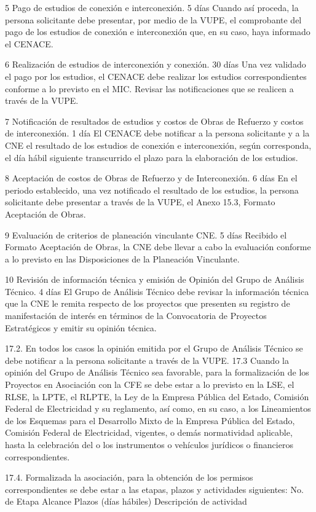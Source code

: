  5
 Pago de estudios de conexión e interconexión. 
 5 días
 Cuando así proceda, la persona solicitante debe presentar, por medio de la VUPE, el comprobante del pago de los estudios de conexión e interconexión que, en su caso, haya informado el CENACE.
 
 6
 Realización de estudios de interconexión y conexión.
 30 días
 Una vez validado el pago por los estudios, el CENACE debe realizar los estudios correspondientes conforme a lo previsto en el MIC. Revisar las notificaciones que se realicen a través de la VUPE.
 
 7
 Notificación de resultados de estudios y costos de Obras de Refuerzo y costos de interconexión.
 1 día
 El CENACE debe notificar a la persona solicitante y a la CNE el resultado de los estudios de conexión e interconexión, según corresponda, el día hábil siguiente transcurrido el plazo para la elaboración de los estudios. 
 
 8
 Aceptación de costos de Obras de Refuerzo y de Interconexión.
 6 días
 En el periodo establecido, una vez notificado el resultado de los estudios, la persona solicitante debe presentar a través de la VUPE, el Anexo 15.3, Formato Aceptación de Obras.
 
 9
 Evaluación de criterios de planeación vinculante CNE.
 5 días
 Recibido el Formato Aceptación de Obras, la CNE debe llevar a cabo la evaluación conforme a lo previsto en las Disposiciones de la Planeación Vinculante.
 
 10
 Revisión de información técnica y emisión de Opinión del Grupo de Análisis Técnico.
 4 días
 El Grupo de Análisis Técnico debe revisar la información técnica que la CNE le remita respecto de los proyectos que presenten su registro de manifestación de interés en términos de la Convocatoria de Proyectos Estratégicos y emitir su opinión técnica. 
 
 
17.2. En todos los casos la opinión emitida por el Grupo de Análisis Técnico se debe notificar a la persona solicitante a través de la VUPE.
17.3 Cuando la opinión del Grupo de Análisis Técnico sea favorable, para la formalización de los Proyectos en Asociación con la CFE se debe estar a lo previsto en la LSE, el RLSE, la LPTE, el RLPTE, la Ley de la Empresa Pública del Estado, Comisión Federal de Electricidad y su reglamento, así como, en su caso, a los Lineamientos de los Esquemas para el Desarrollo Mixto de la Empresa Pública del Estado, Comisión Federal de Electricidad, vigentes, o demás normatividad aplicable, hasta la celebración del o los instrumentos o vehículos jurídicos o financieros correspondientes.\par
17.4. Formalizada la asociación, para la obtención de los permisos correspondientes se debe estar a las etapas, plazos y actividades siguientes:
No. de Etapa
 Alcance
 Plazos (días hábiles)
 Descripción de actividad
 
